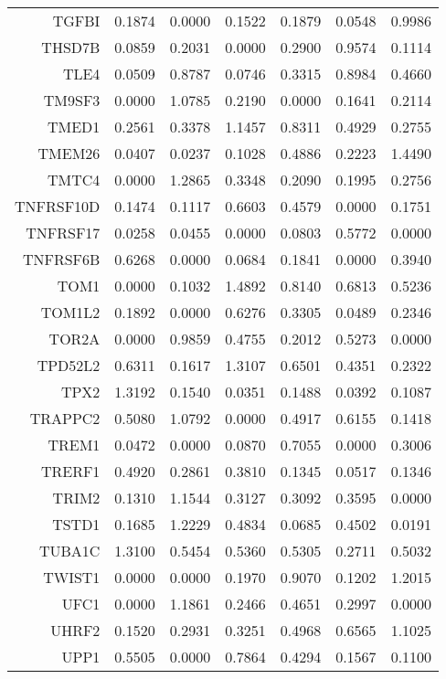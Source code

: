 \begin{longtable}{rrrrrrr}
  TGFBI & 0.1874 & 0.0000 & 0.1522 & 0.1879 & 0.0548 & 0.9986 \\ 
  THSD7B & 0.0859 & 0.2031 & 0.0000 & 0.2900 & 0.9574 & 0.1114 \\ 
  TLE4 & 0.0509 & 0.8787 & 0.0746 & 0.3315 & 0.8984 & 0.4660 \\ 
  TM9SF3 & 0.0000 & 1.0785 & 0.2190 & 0.0000 & 0.1641 & 0.2114 \\ 
  TMED1 & 0.2561 & 0.3378 & 1.1457 & 0.8311 & 0.4929 & 0.2755 \\ 
  TMEM26 & 0.0407 & 0.0237 & 0.1028 & 0.4886 & 0.2223 & 1.4490 \\ 
  TMTC4 & 0.0000 & 1.2865 & 0.3348 & 0.2090 & 0.1995 & 0.2756 \\ 
  TNFRSF10D & 0.1474 & 0.1117 & 0.6603 & 0.4579 & 0.0000 & 0.1751 \\ 
  TNFRSF17 & 0.0258 & 0.0455 & 0.0000 & 0.0803 & 0.5772 & 0.0000 \\ 
  TNFRSF6B & 0.6268 & 0.0000 & 0.0684 & 0.1841 & 0.0000 & 0.3940 \\ 
  TOM1 & 0.0000 & 0.1032 & 1.4892 & 0.8140 & 0.6813 & 0.5236 \\ 
  TOM1L2 & 0.1892 & 0.0000 & 0.6276 & 0.3305 & 0.0489 & 0.2346 \\ 
  TOR2A & 0.0000 & 0.9859 & 0.4755 & 0.2012 & 0.5273 & 0.0000 \\ 
  TPD52L2 & 0.6311 & 0.1617 & 1.3107 & 0.6501 & 0.4351 & 0.2322 \\ 
  TPX2 & 1.3192 & 0.1540 & 0.0351 & 0.1488 & 0.0392 & 0.1087 \\ 
  TRAPPC2 & 0.5080 & 1.0792 & 0.0000 & 0.4917 & 0.6155 & 0.1418 \\ 
  TREM1 & 0.0472 & 0.0000 & 0.0870 & 0.7055 & 0.0000 & 0.3006 \\ 
  TRERF1 & 0.4920 & 0.2861 & 0.3810 & 0.1345 & 0.0517 & 0.1346 \\ 
  TRIM2 & 0.1310 & 1.1544 & 0.3127 & 0.3092 & 0.3595 & 0.0000 \\ 
  TSTD1 & 0.1685 & 1.2229 & 0.4834 & 0.0685 & 0.4502 & 0.0191 \\ 
  TUBA1C & 1.3100 & 0.5454 & 0.5360 & 0.5305 & 0.2711 & 0.5032 \\ 
  TWIST1 & 0.0000 & 0.0000 & 0.1970 & 0.9070 & 0.1202 & 1.2015 \\ 
  UFC1 & 0.0000 & 1.1861 & 0.2466 & 0.4651 & 0.2997 & 0.0000 \\ 
  UHRF2 & 0.1520 & 0.2931 & 0.3251 & 0.4968 & 0.6565 & 1.1025 \\ 
  UPP1 & 0.5505 & 0.0000 & 0.7864 & 0.4294 & 0.1567 & 0.1100 \\ 

\end{longtable}
